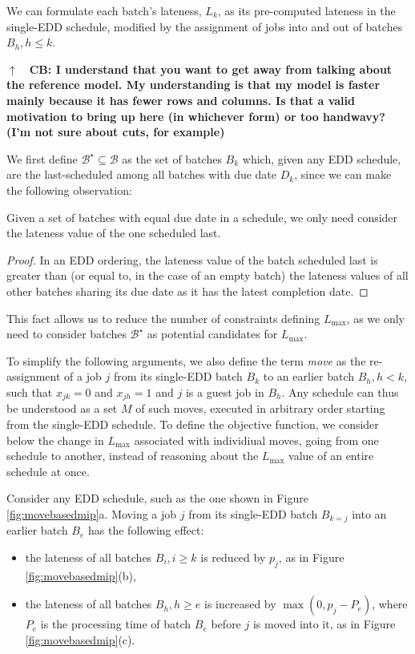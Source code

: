 \documentclass[oribibl]{llncs}
\def\Lmax{{L_{\mathrm{max}}}}
\begin{document}
We can formulate each batch's lateness, $L_k$, as its pre-computed
lateness in the single-EDD schedule, modified by the assignment of jobs into and
out of batches $B_h, h \leq k$.

\textbf{$\uparrow\quad $CB: I understand that you want to get away
from talking about the reference model. My understanding is that my model is faster
mainly because it has fewer rows and columns. Is that a valid motivation to bring up
here (in whichever form) or too handwavy? (I'm not sure about cuts, for
example)}

We first define $\mathcal{B}^\star \subseteq \mathcal{B}$ as the set of batches
$B_k$ which, given any EDD schedule, are the last-scheduled among all batches
with due date $D_k$, since we can make the following observation:
\begin{proposition}
Given a set of batches with equal due date in a schedule, we only need
consider the lateness value of the one scheduled last.
\end{proposition}
\begin{proof}
  In an EDD ordering, the lateness value of the batch scheduled last is greater
  than (or equal to, in the case of an empty batch) the lateness values
  of all other batches sharing its due date as it has the latest completion
  date.
\end{proof}
This fact allows us to reduce the number of constraints defining $\Lmax$, as
we only need to consider batches $\mathcal{B}^\star$ as potential candidates for
$\Lmax$.

To simplify the following arguments, we also define the term
\textit{move} as the re-assignment of a job $j$ from its single-EDD
batch $B_k$ to an earlier batch $B_h, h < k$, such that $x_{jk}=0$ and $x_{jh}=1$ and $j$
is a guest job in $B_h$.
Any schedule can thus be understood as a set $M$ of such moves, executed in arbitrary
order starting from the single-EDD schedule. To define the objective function,
we consider below the change in $\Lmax$ associated with individiual moves, going
from one schedule to another, instead of reasoning about the $\Lmax$ value of an entire schedule at once.

Consider any EDD
schedule, such as the one shown in Figure \ref{fig:movebasedmip}a. Moving
a job $j$ from its single-EDD batch $B_{k=j}$ into an earlier batch
$B_e$ has the following effect:

\begin{itemize}
\item{the lateness of all batches $B_i, i \geq k$ is reduced by $p_j$,
    as in Figure \ref{fig:movebasedmip}(b),}
\item{the lateness of all batches $B_h, h \geq e$ is increased by
$\max(0,p_j - P_e)$, where $P_e$ is the processing time of batch $B_e$
before $j$ is moved into it, as in Figure \ref{fig:movebasedmip}(c).}
\end{itemize}
\end{document}
